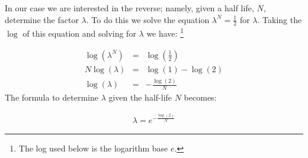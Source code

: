\documentclass{article}
\begin{document}
In our case we are interested in the reverse; namely, given a half life, $N$, 
determine the factor $\lambda$. To do this we solve the equation $\lambda^N = \frac{1}{2}$
for $\lambda$.
Taking the $\log$ of this equation and solving for $\lambda$ we have:%
\footnote{The log used below is the logarithm base $e$.}

\begin{eqnarray*}
    \log(\lambda^N) & = & \log(\frac{1}{2}) \\
    N \log(\lambda) & = & \log(1) - \log(2) \\
    \log(\lambda) & = & -\frac{\log(2)}{N}
\end{eqnarray*}
The formula to determine $\lambda$ given the half-life $N$ becomes:

\begin{eqnarray}
    \lambda = e^{-\frac{\log(2)}{N}}
\end{eqnarray}
\end{document}
